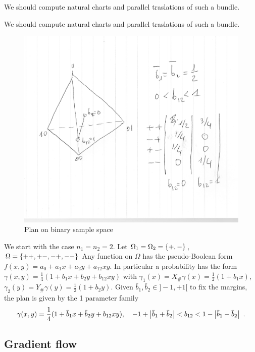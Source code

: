 \documentclass[runningheads]{llncs}
\begin{document}
\begin{remark}
  We should compute natural charts and parallel traslations of such a bundle.
\end{remark}

\begin{remark}
  We should compute natural charts and parallel traslations of such a bundle.
\end{remark}

\begin{exercise} 
%
  \begin{figure}[t]
    \centering
    \includegraphics[width=.4\textwidth]{plan2x2.pdf}
    \caption{Plan on binary sample space}
    \label{fig:1}
  \end{figure}
%
We start with the case $n_1=n_2=2$. Let $\Omega_1=\Omega_2=\left\{ +,- \right\}$, $\Omega=\left\{ ++,+-,-+,-- \right\}$ Any function on $\Omega$ has the pseudo-Boolean form $f(x,y)=a_0+a_1 x + a_2 y + a_{12} xy$. In particular a probability has the form $\gamma(x,y) = \frac14(1+b_1x+b_2y+b_{12}xy)$ with $\gamma_1(x) = X_{\#}\gamma (x)= \frac12(1+b_1x)$, $\gamma_2(y) = Y_\# \gamma(y) = \frac12(1+b_2y)$. Given $\bar b_1, \bar b_2 \in ]-1,+1[$ to fix the margins, the plan is given by the 1 parameter family 
%
  \begin{equation*}
    \gamma(x,y) = \frac14(1+\bar b_1x+\bar b_2y+b_{12}xy), \quad -1 + \left| \bar b_1+\bar b_2 \right| < b_{12} < 1 - \left| \bar b_1 - \bar b_2 \right| \ .
  \end{equation*}
\end{exercise}

\subsection{Gradient flow}
\end{document}
